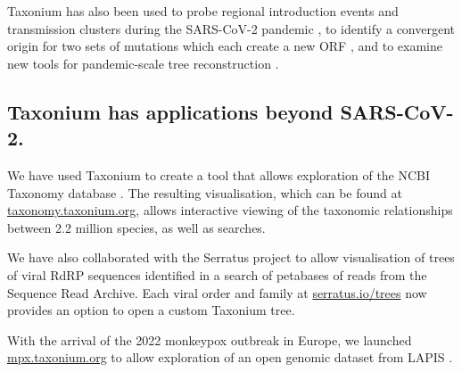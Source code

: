 Taxonium has also been used  to probe  regional introduction events and transmission clusters during the SARS-CoV-2 pandemic \citep{mcbroome2022identifying}, to identify a convergent origin for two sets of mutations which each create a new ORF \citep{Mears2022}, and to examine new tools for pandemic-scale tree reconstruction \citep{DeMaio2022}.



\subsection*{Taxonium has applications beyond SARS-CoV-2.}

We have used Taxonium to create a tool that allows exploration of the NCBI Taxonomy database \citep{federhen2012ncbi}. The resulting visualisation, which can be found at \href{http://taxonomy.taxonium.org}{taxonomy.taxonium.org}, allows interactive viewing of the taxonomic relationships between 2.2 million species, as well as searches.


We have also collaborated with the Serratus project \citep{edgar2022petabase} to allow visualisation of trees of viral RdRP sequences identified in a search of petabases of reads from the Sequence Read Archive. Each viral order and family at \href{http://serratus.io/trees}{serratus.io/trees} now provides an option to open a custom Taxonium tree.

With the arrival of the 2022 monkeypox outbreak in Europe, we launched \href{http://mpx.taxonium.org}{mpx.taxonium.org} to allow exploration of an open genomic dataset from LAPIS \citep{lapis}.



